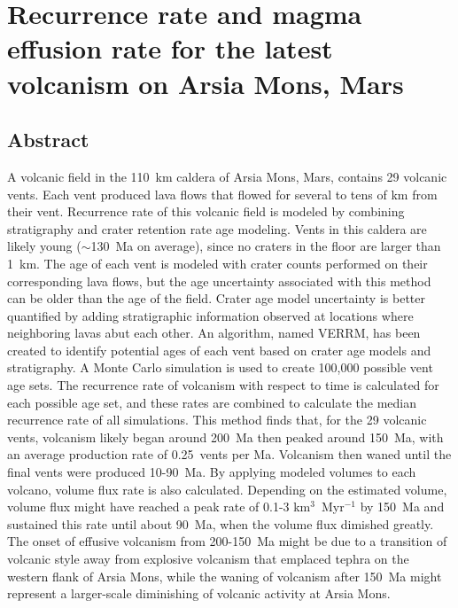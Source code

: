 \chapter[Recurrence rate and magma effusion rate for the latest volcanism on Arsia Mons, Mars]{Recurrence rate and magma effusion rate for the latest volcanism on Arsia Mons, Mars}\label{ch_arsia}

\renewcommand*{\FigPath}{figures/chapter-arsia}

\section{Abstract}
A volcanic field in the 110~km caldera of Arsia Mons, Mars, contains 29 volcanic vents. Each vent produced lava flows that flowed for several to tens of km from their vent. Recurrence rate of this volcanic field is modeled by combining stratigraphy and crater retention rate age modeling. Vents in this caldera are likely young ($\sim$130~Ma on average), since no craters in the floor are larger than 1~km. The age of each vent is modeled with crater counts performed on their corresponding lava flows, but the age uncertainty associated with this method can be older than the age of the field. Crater age model uncertainty is better quantified by adding stratigraphic information observed at locations where neighboring lavas abut each other. An algorithm, named VERRM, has been created to identify potential ages of each vent based on crater age models and stratigraphy. A Monte Carlo simulation is used to create 100,000 possible vent age sets. The recurrence rate of volcanism with respect to time is calculated for each possible age set, and these rates are combined to calculate the median recurrence rate of all simulations. This method finds that, for the 29 volcanic vents, volcanism likely began around 200~Ma then peaked around 150~Ma, with an average production rate of 0.25~vents per Ma. Volcanism then waned until the final vents were produced 10-90~Ma. By applying modeled volumes to each volcano, volume flux rate is also calculated. Depending on the estimated volume, volume flux might have reached a peak rate of 0.1-3 km$^3$~Myr$^{-1}$ by 150~Ma and sustained this rate until about 90~Ma, when the volume flux dimished greatly. The onset of effusive volcanism from 200-150~Ma might be due to a transition of volcanic style away from explosive volcanism that emplaced tephra on the western flank of Arsia Mons, while the waning of volcanism after 150~Ma might represent a larger-scale diminishing of volcanic activity at Arsia Mons.

